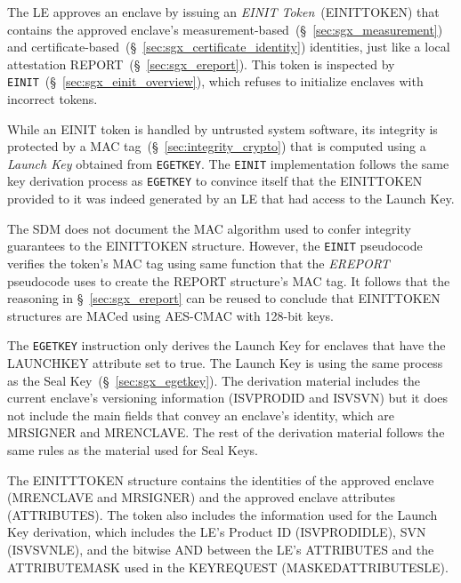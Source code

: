 
The LE approves an enclave by issuing an \textit{EINIT Token}~(EINITTOKEN) that
contains the approved enclave's
measurement-based~(\S~\ref{sec:sgx_measurement})
and certificate-based~(\S~\ref{sec:sgx_certificate_identity}) identities, just
like a local attestation REPORT~(\S~\ref{sec:sgx_ereport}). This token is
inspected by \texttt{EINIT}~(\S~\ref{sec:sgx_einit_overview}), which refuses to
initialize enclaves with incorrect tokens.

While an EINIT token is handled by untrusted system software, its integrity is
protected by a MAC tag~(\S~\ref{sec:integrity_crypto}) that is computed using a
\textit{Launch Key} obtained from \texttt{EGETKEY}. The \texttt{EINIT}
implementation follows the same key derivation process as \texttt{EGETKEY} to
convince itself that the EINITTOKEN provided to it was indeed generated by an
LE that had access to the Launch Key.

The SDM does not document the MAC algorithm used to confer integrity guarantees
to the EINITTOKEN structure. However, the \texttt{EINIT} pseudocode verifies
the token's MAC tag using same function that the \textit{EREPORT} pseudocode
uses to create the REPORT structure's MAC tag. It follows that the reasoning in
\S~\ref{sec:sgx_ereport} can be reused to conclude that EINITTOKEN structures
are MACed using AES-CMAC with 128-bit keys.


The \texttt{EGETKEY} instruction only derives the Launch Key for enclaves that
have the LAUNCHKEY attribute set to true. The Launch Key is using the same
process as the Seal Key~(\S~\ref{sec:sgx_egetkey}). The derivation material
includes the current enclave's versioning information (ISVPRODID and ISVSVN)
but it does not include the main fields that convey an enclave's identity,
which are MRSIGNER and MRENCLAVE. The rest of the derivation material follows
the same rules as the material used for Seal Keys.

The EINITTTOKEN structure contains the identities of the approved enclave
(MRENCLAVE and MRSIGNER) and the approved enclave attributes (ATTRIBUTES). The
token also includes the information used for the Launch Key derivation,
which includes the LE's Product ID (ISVPRODIDLE), SVN (ISVSVNLE), and the
bitwise AND between the LE's ATTRIBUTES and the ATTRIBUTEMASK used in the
KEYREQUEST (MASKEDATTRIBUTESLE).

